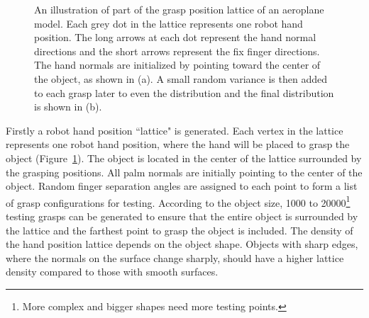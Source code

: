 \begin{figure}
  \centering
  \caption{\scriptsize{An illustration of part of the grasp position lattice of an aeroplane model. Each grey dot in the lattice represents one robot hand position. The long arrows at each dot represent the hand normal directions and the short arrows represent the fix finger directions. The hand normals are initialized by pointing toward the center of the object, as shown in (a). A small random variance is then added to each grasp later to even the distribution and the final distribution is shown in (b).}
}
    \label{lattice}
\end{figure}

Firstly a robot hand position ``lattice" is generated. Each vertex in the lattice represents one robot hand position, where the hand will be placed to grasp the object (Figure~\ref{lattice}). The object is located in the center of the lattice surrounded by the grasping positions. All palm normals are initially pointing to the center of the object. Random finger separation angles are assigned to each point to form a list of grasp configurations for testing. According to the object size, 1000 to 20000\footnote{More complex and bigger shapes need more testing points.} testing grasps can be generated to ensure that the entire object is surrounded by the lattice and the farthest point to grasp the object is included. The density of the hand position lattice depends on the object shape. Objects with sharp edges, where the normals on the surface change sharply, should have a higher lattice density compared to those with smooth surfaces.

